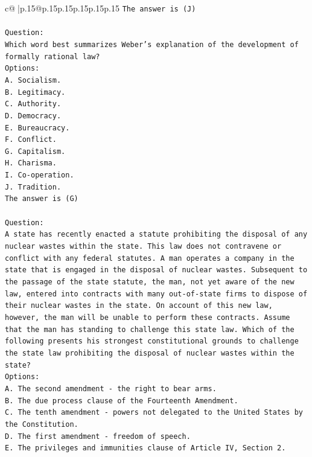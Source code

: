 \documentclass{article}
\begin{document}
{\begin{supertabular}{c@{$\;$}|p{.15\linewidth}@{}p{.15\linewidth}p{.15\linewidth}p{.15\linewidth}p{.15\linewidth}p{.15\linewidth}}
{{{\texttt{The answer is (J)} \\
\\ 
\texttt{Question:} \\
\texttt{Which word best summarizes Weber's explanation of the development of formally rational law?} \\
\texttt{Options:} \\
\texttt{A. Socialism.} \\
\texttt{B. Legitimacy.} \\
\texttt{C. Authority.} \\
\texttt{D. Democracy.} \\
\texttt{E. Bureaucracy.} \\
\texttt{F. Conflict.} \\
\texttt{G. Capitalism.} \\
\texttt{H. Charisma.} \\
\texttt{I. Co{-}operation.} \\
\texttt{J. Tradition.} \\
\texttt{The answer is (G)} \\
\\ 
\texttt{Question:} \\
\texttt{A state has recently enacted a statute prohibiting the disposal of any nuclear wastes within the state. This law does not contravene or conflict with any federal statutes. A man operates a company in the state that is engaged in the disposal of nuclear wastes. Subsequent to the passage of the state statute, the man, not yet aware of the new law, entered into contracts with many out{-}of{-}state firms to dispose of their nuclear wastes in the state. On account of this new law, however, the man will be unable to perform these contracts. Assume that the man has standing to challenge this state law. Which of the following presents his strongest constitutional grounds to challenge the state law prohibiting the disposal of nuclear wastes within the state?} \\
\texttt{Options:} \\
\texttt{A. The second amendment {-} the right to bear arms.} \\
\texttt{B. The due process clause of the Fourteenth Amendment.} \\
\texttt{C. The tenth amendment {-} powers not delegated to the United States by the Constitution.} \\
\texttt{D. The first amendment {-} freedom of speech.} \\
\texttt{E. The privileges and immunities clause of Article IV, Section 2.} \\
}}}
\end{supertabular}}
\end{document}
